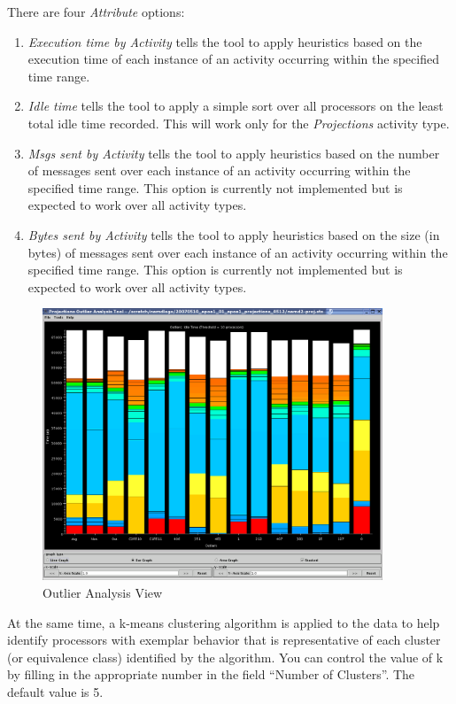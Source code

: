 There are four {\em Attribute} options:
\begin{enumerate}
\item {\em Execution time by Activity} tells the tool to apply heuristics
based on the execution time of each instance of an activity occurring
within the specified time range.
\item {\em Idle time} tells the tool to apply a simple sort over all
processors on the least total idle time recorded. This will work only for
the {\em Projections} activity type.
\item {\em Msgs sent by Activity} tells the tool to apply heuristics
based on the number of messages sent over each instance of an
activity occurring within the specified time range. This option is
currently not implemented but is expected to work over all activity
types.
\item {\em Bytes sent by Activity} tells the tool to apply heuristics
based on the size (in bytes) of messages sent over each instance of an
activity occurring within the specified time range. This option is
currently not implemented but is expected to work over all activity
types.
\end{enumerate}

\begin{figure}[htb]
\center
\includegraphics[width=4.0in]{fig/apoa1_512_outlierWithClusters}
\caption{Outlier Analysis View}
\label{outlier view}
\end{figure}

At the same time, a k-means clustering algorithm is applied to the
data to help identify processors with exemplar behavior that is
representative of each cluster (or equivalence class) identified by
the algorithm. You can control the value of k by filling in the
appropriate number in the field ``Number of Clusters''. The default
value is 5.


